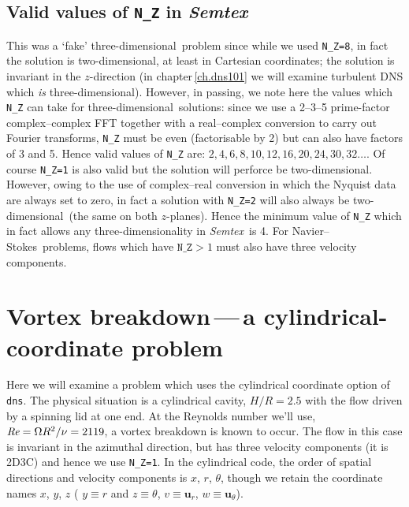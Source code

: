 \documentclass[11pt]{report}
\def\Rey{\mbox{\it Re}}                             %
\newcommand{\Semtex}{\emph{Semtex}} \newcommand{\Dog}{\emph{Dog}}
\newcommand\twod{two-di\-men\-sion\-al}
\newcommand\threed{three-di\-men\-sion\-al}
\newcommand{\eg}{e.g.\ } \newcommand{\CC}{\mathrm{c.c.}}
\newcommand\NavSto{Navier--Stokes}
\begin{document}
\subsection{Valid values of \texttt{N\_Z} in \Semtex}
\label{sec.nz}

This was a `fake' \threed\ problem since while we used \verb|N_Z=8|,
in fact the solution is \twod, at least in Cartesian coordinates; the
solution is invariant in the $z$-direction (in
chapter\,\ref{ch.dns101} we will examine turbulent DNS which \emph{is}
\threed). However, in passing, we note here the values which
\verb|N_Z| can take for \threed\ solutions: since we use a 2--3--5
prime-factor complex--complex FFT \citep{temp92} together with a
real--complex conversion \citep[\eg \S\,12.3,][]{press92} to carry out
Fourier transforms, \verb|N_Z| must be even (factorisable by 2) but
can also have factors of 3 and 5.  Hence valid values of \verb|N_Z|
are: $2, 4, 6, 8, 10, 12, 16, 20, 24, 30, 32 \ldots$.  Of course
\verb|N_Z=1| is also valid but the solution will perforce be \twod.
However, owing to the use of complex--real conversion in which the
Nyquist data are always set to zero, in fact a solution with
\verb|N_Z=2| will also always be \twod\ (the same on both $z$-planes).
Hence the minimum value of \verb|N_Z| which in fact allows any
\threed\-ity in \Semtex\ is 4.  For \NavSto\ problems, flows which
have $\texttt{N\_Z}>1$ must also have three velocity components.

\section{Vortex breakdown\,---\,a cylindrical-coordinate problem}
\label{sec.vb}

Here we will examine a problem which uses the cylindrical coordinate
option of \verb+dns+.  The physical situation is a cylindrical cavity,
$H/R=2.5$ with the flow driven by a spinning lid at one end.  At the
Reynolds number we'll use, $\Rey=\Omega R^2/\nu=2119$, a vortex
breakdown is known to occur.  The flow in this case is invariant in
the azimuthal direction, but has three velocity components (it is
2D3C) and hence we use \verb|N_Z=1|.  In the cylindrical code, the
order of spatial directions and velocity components is $x$, $r$,
$\theta$, though we retain the coordinate names $x$, $y$, $z$ (\ie
$y\equiv r$ and $z\equiv\theta$, $v\equiv\bm{u}_r$,
$w\equiv\bm{u}_\theta$).
\end{document}
